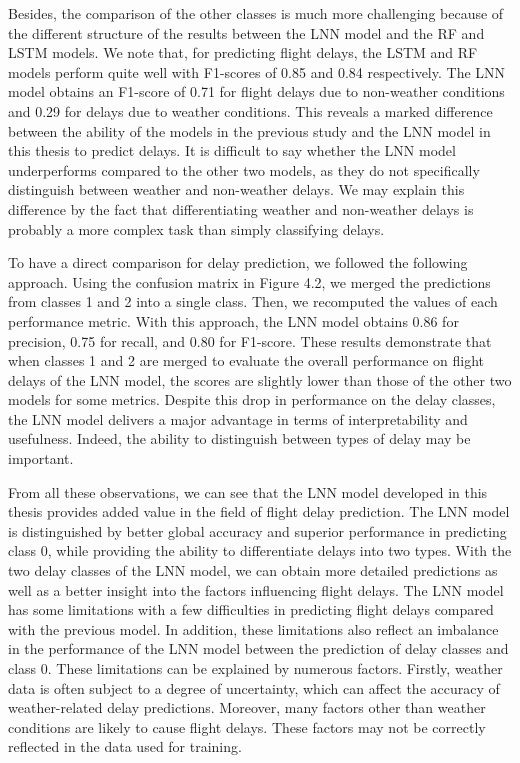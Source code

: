 \documentclass[12pt,oneside]{book} %
\begin{document}
\noindent Besides, the comparison of the other classes is much more challenging because of the different structure of the results between the LNN model and the RF and LSTM models. We note that, for predicting flight delays, the LSTM and RF models perform quite well with F1-scores of 0.85 and 0.84 respectively. The LNN model obtains an F1-score of 0.71 for flight delays due to non-weather conditions and 0.29 for delays due to weather conditions. This reveals a marked difference between the ability of the models in the previous study and the LNN model in this thesis to predict delays. It is difficult to say whether the LNN model underperforms compared to the other two models, as they do not specifically distinguish between weather and non-weather delays. We may explain this difference by the fact that differentiating weather and non-weather delays is probably a more complex task than simply classifying delays.

\noindent To have a direct comparison for delay prediction, we followed the following approach. Using the confusion matrix in Figure 4.2, we merged the predictions from classes 1 and 2 into a single class. Then, we recomputed the values of each performance metric. With this approach, the LNN model obtains 0.86 for precision, 0.75 for recall, and 0.80 for F1-score. These results demonstrate that when classes 1 and 2 are merged to evaluate the overall performance on flight delays of the LNN model, the scores are slightly lower than those of the other two models for some metrics. Despite this drop in performance on the delay classes, the LNN model delivers a major advantage in terms of interpretability and usefulness. Indeed, the ability to distinguish between types of delay may be important.

\noindent From all these observations, we can see that the LNN model developed in this thesis provides added value in the field of flight delay prediction. The LNN model is distinguished by better global accuracy and superior performance in predicting class 0, while providing the ability to differentiate delays into two types. With the two delay classes of the LNN model, we can obtain more detailed predictions as well as a better insight into the factors influencing flight delays. The LNN model has some limitations with a few difficulties in predicting flight delays compared with the previous model. In addition, these limitations also reflect an imbalance in the performance of the LNN model between the prediction of delay classes and class 0. These limitations can be explained by numerous factors. Firstly, weather data is often subject to a degree of uncertainty, which can affect the accuracy of weather-related delay predictions. Moreover, many factors other than weather conditions are likely to cause flight delays. These factors may not be correctly reflected in the data used for training.
\end{document}
